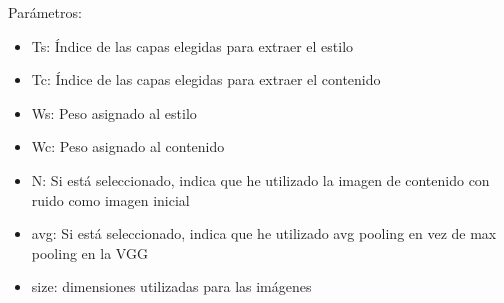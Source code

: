 \documentclass[a4paper, 11pt]{article}
\begin{document}
				Parámetros:
				\begin{itemize}
					\item Ts: Índice de las capas elegidas para extraer el estilo
					\item Tc: Índice de las capas elegidas para extraer el contenido
					\item Ws: Peso asignado al estilo
					\item Wc: Peso asignado al contenido
					\item N: Si está seleccionado, indica que he utilizado la imagen de contenido con ruido como imagen inicial
					\item avg: Si está seleccionado, indica que he utilizado avg pooling en vez de max pooling en la VGG
					\item size: dimensiones utilizadas para las imágenes 
				\end{itemize} 
				
\end{document}
